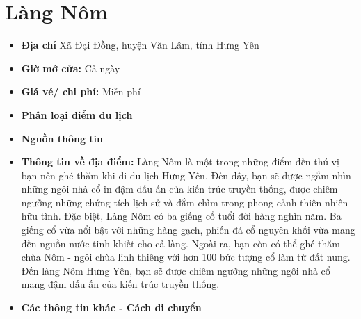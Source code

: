 \documentclass{article}
\begin{document}
\section{Làng Nôm}
\begin{itemize}
    \item{\textbf{Địa chỉ}} Xã Đại Đồng, huyện Văn Lâm, tỉnh Hưng Yên

    \item{\textbf{Giờ mở cửa:}} Cả ngày

    \item{\textbf{Giá vé/ chi phí:}} Miễn phí

    \item{\textbf{Phân loại điểm du lịch}} 

    \item{\textbf{Nguồn thông tin}} 

    \item{\textbf{Thông tin về địa điểm:}} Làng Nôm là một trong những điểm đến thú vị bạn nên ghé thăm khi đi du lịch Hưng Yên. Đến đây, bạn sẽ được ngắm nhìn những ngôi nhà cổ in đậm dấu ấn của kiến trúc truyền thống, được chiêm ngưỡng những chứng tích lịch sử và đắm chìm trong phong cảnh thiên nhiên hữu tình. Đặc biệt, Làng Nôm có ba giếng cổ tuổi đời hàng nghìn năm. Ba giếng cổ vừa nổi bật với những hàng gạch, phiến đá cổ nguyên khối vừa mang đến nguồn nước tinh khiết cho cả làng. Ngoài ra, bạn còn có thể ghé thăm chùa Nôm - ngôi chùa linh thiêng với hơn 100 bức tượng cổ làm từ đất nung. Đến làng Nôm Hưng Yên, bạn sẽ được chiêm ngưỡng những ngôi nhà cổ mang đậm dấu ấn của kiến trúc truyền thống.
\end{itemize}

\begin{itemize}
    \item{\textbf{Các thông tin khác - Cách di chuyển}} 
\end{itemize}
\end{document}
